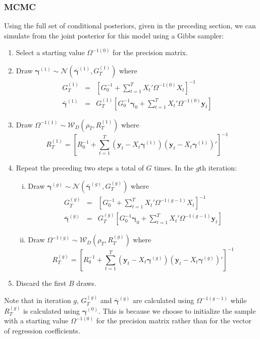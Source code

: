 \documentclass[12pt]{article}
\begin{document}
\subsubsection{MCMC}
Using the full set of conditional posteriors, given in the preceding section, we can simulate from the joint posterior for this model using a Gibbs sampler:
\begin{enumerate}
	\item Select a starting value $\Omega^{-1(0)}$ for the precision matrix.
	\item Draw $\boldsymbol{\gamma}^{(1)} \sim \mathcal{N}\left( \bar{\boldsymbol{\gamma}}^{(1)}, G_T^{(1)}\right)$ where
	\begin{eqnarray*}
		G_T^{(1)} &=& \left[ G_0^{-1} + \sum_{t=1}^T X_t' \Omega^{-1(0)} X_t \right]^{-1}\\
		\bar{\boldsymbol{\gamma}}^{(1)} &=& G_T^{(1)} \left[ G_0^{-1}\boldsymbol{\gamma}_0 + \sum_{t=1}^{T} X_t'\Omega^{-1(0)}\mathbf{y}_t \right]
	\end{eqnarray*}
	\item Draw $\Omega^{-1(1)} \sim \mathcal{W}_D\left(\rho_T, R_T^{(1)}\right)$ where
	\begin{equation*}
	R_T^{(1)} = \left[ R_0^{-1} + \sum_{t=1}^{T} \left( \mathbf{y}_t - X_t \boldsymbol{\gamma}^{(1)} \right)\left( \mathbf{y}_t - X_t \boldsymbol{\gamma}^{(1)} \right)' \right]^{-1}
	\end{equation*}
	\item Repeat the preceding two steps a total of $G$ times.
	In the $g$th iteration:
	\begin{enumerate}[(i)]
		\item Draw $\boldsymbol{\gamma}^{(g)} \sim \mathcal{N}\left( \bar{\boldsymbol{\gamma}}^{(g)}, G_T^{(g)}\right)$ where
		\begin{eqnarray*}
			G_T^{(g)} &=& \left[ G_0^{-1} + \sum_{t=1}^T X_t' \Omega^{-1(g-1)} X_t \right]^{-1}\\
			\bar{\boldsymbol{\gamma}}^{(g)} &=& G_T^{(g)} \left[ G_0^{-1}\boldsymbol{\gamma}_0 + \sum_{t=1}^{T} X_t'\Omega^{-1(g-1)}\mathbf{y}_t \right]
		\end{eqnarray*}
		\item Draw $\Omega^{-1(g)} \sim \mathcal{W}_D\left(\rho_T, R_T^{(g)}\right)$ where
		\begin{equation*}
		R_T^{(g)} = \left[ R_0^{-1} + \sum_{t=1}^{T} \left( \mathbf{y}_t - X_t \boldsymbol{\gamma}^{(g)} \right)\left( \mathbf{y}_t - X_t \boldsymbol{\gamma}^{(g)} \right)' \right]^{-1}
		\end{equation*}
	\end{enumerate}
	\item Discard the first $B$ draws.
\end{enumerate}
Note that in iteration $g$, $G_T^{(g)}$ and $\bar{\boldsymbol{\gamma}}^{(g)}$ are calculated using $\Omega^{-1(g-1)}$ while $R_T^{(g)}$ is calculated using $\boldsymbol{\gamma}^{(0)}$.
This is because we choose to initialize the sample with a starting value $\Omega^{-1(0)}$ for the precision matrix rather than for the vector of regression coefficients.
\end{document}
